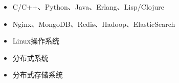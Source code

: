   \begin{itemize}[leftmargin=*]
    \item C/C++、Python、Java、Erlang、Lisp/Clojure
    \item Nginx、MongoDB、Redis、Hadoop、ElasticSearch
    \item Linux操作系统
    \item 分布式系统
    \item 分布式存储系统
  \end{itemize}

